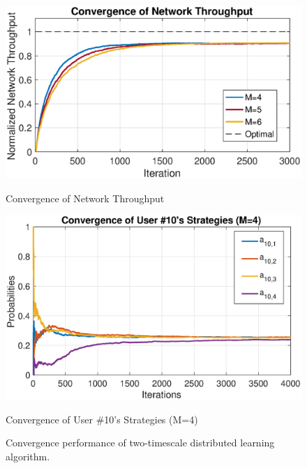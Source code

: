 \begin{figure}[!t]
	\begin{minipage}[t]{0.48\textwidth}
		\centering
		\includegraphics[scale=0.41]{./pic/conv_ch3.eps}
		\caption{Convergence of Network Throughput}\label{fg:conv1}
	\end{minipage}
	\hfill
	\begin{minipage}[t]{0.48\textwidth}
		\centering
		\includegraphics[scale=0.4]{./pic/str_conv4.eps}
		\caption{Convergence of User \#10's Strategies (M=4)}\label{fg:conv2}
	\end{minipage}
	\caption{Convergence performance of two-timescale distributed learning algorithm.}
	\label{fg:Fig11}
\end{figure}





